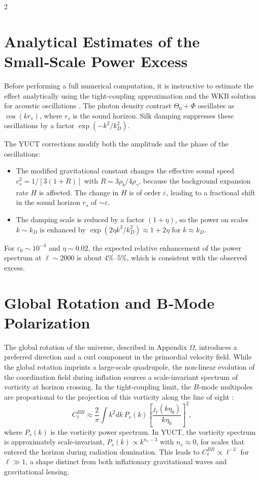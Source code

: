 \documentclass[11pt,a4paper]{article}
\begin{document}
\begin{multicols}{2}
		\section{Analytical Estimates of the Small‑Scale Power Excess}
		
		Before performing a full numerical computation, it is instructive to estimate the effect analytically using the tight‑coupling approximation and the WKB solution for acoustic oscillations \cite{Hu1995}. The photon density contrast $\Theta_0 + \Phi$ oscillates as $\cos(k r_s)$, where $r_s$ is the sound horizon. Silk damping suppresses these oscillations by a factor $\exp(-k^2/k_D^2)$.
		
		The YUCT corrections modify both the amplitude and the phase of the oscillations:
		\begin{itemize}
			\item The modified gravitational constant changes the effective sound speed $c_s^2 = 1/[3(1+R)]$ with $R = 3\rho_b/4\rho_\gamma$, because the background expansion rate $H$ is affected. The change in $H$ is of order $\varepsilon$, leading to a fractional shift in the sound horizon $r_s$ of $\sim \varepsilon$.
			\item The damping scale is reduced by a factor $(1+\eta)$, so the power on scales $k \sim k_D$ is enhanced by $\exp(2\eta k^2/k_D^2) \approx 1 + 2\eta$ for $k \approx k_D$.
		\end{itemize}
		For $\varepsilon_0 \sim 10^{-3}$ and $\eta \sim 0.02$, the expected relative enhancement of the power spectrum at $\ell \sim 2000$ is about $4\%$--$5\%$, which is consistent with the observed excess.
		
		\section{Global Rotation and B‑Mode Polarization}
		
		The global rotation of the universe, described in Appendix $\Omega$, introduces a preferred direction and a curl component in the primordial velocity field. While the global rotation imprints a large-scale quadrupole, the non-linear evolution of the coordination field during inflation sources a scale-invariant spectrum of vorticity at horizon crossing. In the tight‑coupling limit, the $B$‑mode multipoles are proportional to the projection of this vorticity along the line of sight \cite{Cooray2005}:
		\begin{equation}
			C_\ell^{BB} \approx \frac{2}{\pi} \int k^2 dk \, P_v(k) \left[ \frac{j_\ell(k\eta_0)}{k\eta_0} \right]^2,
		\end{equation}
		where $P_v(k)$ is the vorticity power spectrum. In YUCT, the vorticity spectrum is approximately scale‑invariant, $P_v(k) \propto k^{n_v-3}$ with $n_v \approx 0$, for scales that entered the horizon during radiation domination. This leads to $C_\ell^{BB} \propto \ell^{-2}$ for $\ell \gg 1$, a shape distinct from both inflationary gravitational waves and gravitational lensing.
		

\end{multicols}
\end{document}
